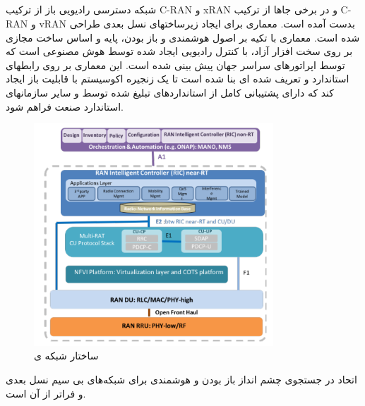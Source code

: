 \subsection{}
شبکه دسترسی رادیویی باز از ترکیب C-RAN و xRAN و در برخی جاها از ترکیب C-RAN و vRAN بدست آمده است.
معماری  برای ایجاد زیرساختهای  نسل بعدی طراحی شده است.
معماری  با تکیه بر اصول هوشمندی و باز بودن، پایه و اساس ساخت  مجازی بر روی سخت افزار آزاد، با کنترل رادیویی ایجاد شده توسط هوش مصنوعی است که توسط اپراتورهای سراسر جهان پیش بینی شده است.
این معماری بر روی رابطهای استاندارد و تعریف شده ای بنا شده است تا یک زنجیره اکوسیستم با قابلیت باز ایجاد کند که دارای پشتیبانی کامل از استانداردهای تبلیغ شده توسط  و سایر سازمانهای استاندارد صنعت فراهم شود.
\begin{figure}%
  \centering
    \includegraphics[width=0.8\textwidth]{./fig/oran1}
  \caption{ساختار شبکه ی  \cite{oranWP}}
  \label{fig:ORAN}
\end{figure}
اتحاد  در جستجوی چشم انداز باز بودن و هوشمندی برای شبکه‌های بی سیم نسل بعدی و فراتر از آن است\cite{oranWP}.
